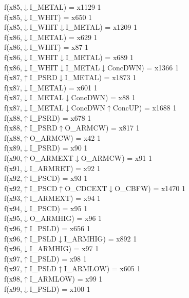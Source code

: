 f(x85,$\downarrow$I\_METAL) = x1129 {1} \\
f(x85,$\downarrow$I\_WHIT) = x650 {1} \\
f(x85,$\downarrow$I\_WHIT$\downarrow$I\_METAL) = x1209 {1} \\
f(x86,$\downarrow$I\_METAL) = x629 {1} \\
f(x86,$\downarrow$I\_WHIT) = x87 {1} \\
f(x86,$\downarrow$I\_WHIT$\downarrow$I\_METAL) = x689 {1} \\
f(x86,$\downarrow$I\_WHIT$\downarrow$I\_METAL$\downarrow$ConcDWN) = x1366 {1} \\
f(x87,$\uparrow$I\_PSRD$\downarrow$I\_METAL) = x1873 {1} \\
f(x87,$\downarrow$I\_METAL) = x601 {1} \\
f(x87,$\downarrow$I\_METAL$\downarrow$ConcDWN) = x88 {1} \\
f(x87,$\downarrow$I\_METAL$\downarrow$ConcDWN$\uparrow$ConcUP) = x1688 {1} \\
f(x88,$\uparrow$I\_PSRD) = x678 {1} \\
f(x88,$\uparrow$I\_PSRD$\uparrow$O\_ARMCW) = x817 {1} \\
f(x88,$\uparrow$O\_ARMCW) = x42 {1} \\
f(x89,$\downarrow$I\_PSRD) = x90 {1} \\
f(x90,$\uparrow$O\_ARMEXT$\downarrow$O\_ARMCW) = x91 {1} \\
f(x91,$\downarrow$I\_ARMRET) = x92 {1} \\
f(x92,$\uparrow$I\_PSCD) = x93 {1} \\
f(x92,$\uparrow$I\_PSCD$\uparrow$O\_CDCEXT$\downarrow$O\_CBFW) = x1470 {1} \\
f(x93,$\uparrow$I\_ARMEXT) = x94 {1} \\
f(x94,$\downarrow$I\_PSCD) = x95 {1} \\
f(x95,$\downarrow$O\_ARMHIG) = x96 {1} \\
f(x96,$\uparrow$I\_PSLD) = x656 {1} \\
f(x96,$\uparrow$I\_PSLD$\downarrow$I\_ARMHIG) = x892 {1} \\
f(x96,$\downarrow$I\_ARMHIG) = x97 {1} \\
f(x97,$\uparrow$I\_PSLD) = x98 {1} \\
f(x97,$\uparrow$I\_PSLD$\uparrow$I\_ARMLOW) = x605 {1} \\
f(x98,$\uparrow$I\_ARMLOW) = x99 {1} \\
f(x99,$\downarrow$I\_PSLD) = x100 {1} \\
